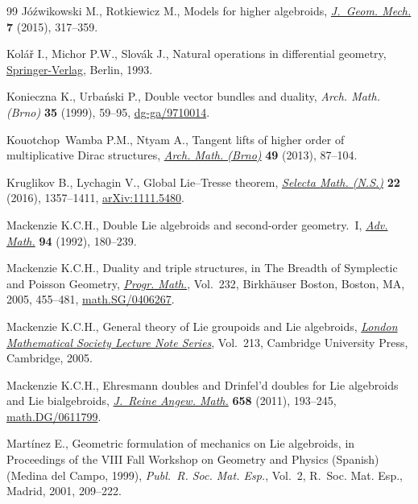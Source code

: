 \begin{thebibliography}{99}
J\'{o}\'{z}wikowski M., Rotkiewicz M., Models for higher algebroids,
 \href{https://doi.org/10.3934/jgm.2015.7.317}{\textit{J.~Geom. Mech.}} \textbf{7} (2015), 317--359.

Kol\'{a}\v{r} I., Michor P.W., Slov\'{a}k J., Natural operations in
 differential geometry, \href{https://doi.org/10.1007/978-3-662-02950-3}{Springer-Verlag}, Berlin, 1993.

Konieczna K., Urba\'{n}ski P., Double vector bundles and duality, \textit{Arch.
 Math. (Brno)} \textbf{35} (1999), 59--95, \href{https://arxiv.org/abs/dg-ga/9710014}{dg-ga/9710014}.

Kouotchop~Wamba P.M., Ntyam A., Tangent lifts of higher order of multiplicative
 {D}irac structures, \href{https://doi.org/10.5817/AM2013-2-87}{\textit{Arch. Math. (Brno)}} \textbf{49} (2013), 87--104.

Kruglikov B., Lychagin V., Global {L}ie--{T}resse theorem, \href{https://doi.org/10.1007/s00029-015-0220-z}{\textit{Selecta
 Math. (N.S.)}} \textbf{22} (2016), 1357--1411, \href{https://arxiv.org/abs/1111.5480}{arXiv:1111.5480}.

Mackenzie K.C.H., Double {L}ie algebroids and second-order geometry.~{I},
 \href{https://doi.org/10.1016/0001-8708(92)90036-K}{\textit{Adv. Math.}} \textbf{94} (1992), 180--239.

Mackenzie K.C.H., Duality and triple structures, in The Breadth of Symplectic
 and {P}oisson Geometry, \href{https://doi.org/10.1007/0-8176-4419-9_15}{\textit{Progr. Math.}}, Vol.~232, Birkh\"{a}user
 Boston, Boston, MA, 2005, 455--481, \href{https://arxiv.org/abs/math.SG/0406267}{math.SG/0406267}.

Mackenzie K.C.H., General theory of {L}ie groupoids and {L}ie algebroids,
 \href{https://doi.org/10.1017/CBO9781107325883}{\textit{London Mathematical Society Lecture Note Series}}, Vol.~213, Cambridge
 University Press, Cambridge, 2005.

Mackenzie K.C.H., Ehresmann doubles and {D}rinfel'd doubles for {L}ie
 algebroids and {L}ie bialgebroids, \href{https://doi.org/10.1515/CRELLE.2011.092}{\textit{J.~Reine Angew. Math.}}
 \textbf{658} (2011), 193--245, \href{https://arxiv.org/abs/math.DG/0611799}{math.DG/0611799}.

Mart\'{i}nez E., Geometric formulation of mechanics on {L}ie algebroids, in
 Proceedings of the {VIII} {F}all {W}orkshop on {G}eometry and {P}hysics
 ({S}panish) ({M}edina del {C}ampo, 1999), \textit{Publ.~R. Soc. Mat. Esp.},
 Vol.~2, R.~Soc. Mat. Esp., Madrid, 2001, 209--222.


\end{thebibliography}
